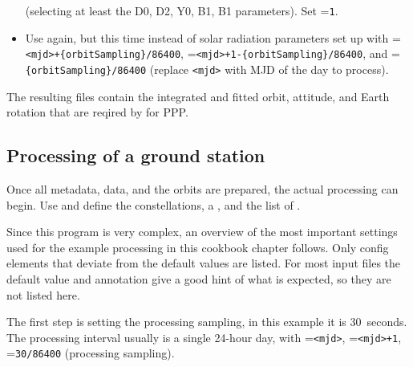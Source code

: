 \begin{itemize}
        (selecting at least the D0, D2, Y0, B1, B1 parameters). Set =\verb|1|.
  \item Use  again, but this time instead of solar radiation parameters set up
         with
        =\verb|<mjd>+{orbitSampling}/86400|, =\verb|<mjd>+1-{orbitSampling}/86400|,
        and =\verb|{orbitSampling}/86400| (replace \verb|<mjd>| with MJD of the day to process).
\end{itemize}

The resulting  files contain the integrated and fitted orbit, attitude, and Earth rotation
that are reqired by  for PPP.

\subsection{Processing of a ground station}\label{cookbook.gnssPpp:processing}

Once all metadata, data, and the orbits are prepared, the actual processing can begin.
Use  and define the 
constellations, a , and
the list of .

Since this program is very complex, an overview of the most important settings used for the example
processing in this cookbook chapter follows. Only config elements that deviate from the default values are listed.
For most input files the default value and annotation give a good hint of what is expected, so they are not
listed here.

The first step is setting the processing sampling, in this example it is 30~seconds.
The processing interval usually is a single 24-hour day,
 with =\verb|<mjd>|,
=\verb|<mjd>+1|, =\verb|30/86400| (processing sampling).

